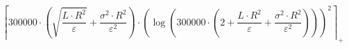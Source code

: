 \[\left\lceil 300000 \cdot \left(\sqrt{\frac{L \cdot R^{2}}{\varepsilon}} + \frac{\sigma^{2} \cdot R^{2}}{\varepsilon^{2}}\right) \cdot \left(\log\left(300000 \cdot \left(2 + \frac{L \cdot R^{2}}{\varepsilon} + \frac{\sigma^{2} \cdot R^{2}}{\varepsilon^{2}}\right)\right)\right)^{2} \right\rceil_{+}\]

